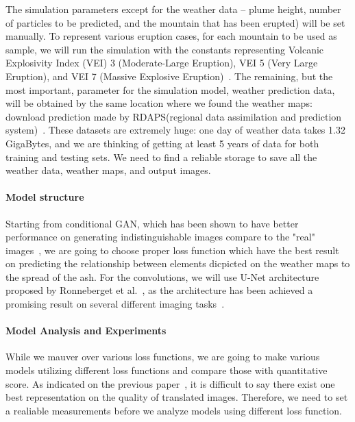 \documentclass{article}
\begin{document}
\begin{doublespacing}
{  The simulation parameters except for the weather data – plume height, number of particles to be 
  predicted, and the mountain that has been erupted) will be set manually. To represent various 
  eruption cases, for each mountain to be used as sample, we will run the simulation with the 
  constants representing Volcanic Explosivity Index (VEI) 3 (Moderate-Large Eruption), VEI 5 (Very 
  Large Eruption), and VEI 7 (Massive Explosive Eruption)~\citep[p. 1232]{Newhall1982}. The 
  remaining, but the most important, parameter for the simulation model, weather prediction data, 
  will be obtained by the same location where we found the weather maps: download prediction made by 
  RDAPS(regional data assimilation and prediction system)~\citep{MDOP}. These datasets are extremely 
  huge: one day of weather data takes 1.32 GigaBytes, and we are thinking of getting at least 5 
  years of data for both training and testing sets. We need to find a reliable storage to save all 
  the weather data, weather maps, and output images.

  \paragraph{Model structure}
  Starting from conditional GAN, which has been shown to have better performance on generating 
  indistinguishable images compare to the "real" images~\citet{isola2016imagetoimage}, we are going 
  to choose proper loss function which have the best result on predicting the relationship between 
  elements dicpicted on the weather maps to the spread of the ash. For the convolutions, we will use
  U-Net architecture proposed by Ronneberget et al.~\citet{ronneberger2015unet}, as the architecture
  has been achieved a promising result on several different imaging 
  tasks~\citep{isola2016imagetoimage, james2018simtoreal}.

  \paragraph{Model Analysis and Experiments}
  While we mauver over various loss functions, we are going to make various models utilizing 
  different loss functions and compare those with quantitative score. As indicated on the previous
  paper~\citet{isola2016imagetoimage}, it is difficult to say there exist one best representation on
  the quality of translated images. Therefore, we need to set a realiable measurements before we 
  analyze models using different loss function.

}
\end{doublespacing}
\end{document}
